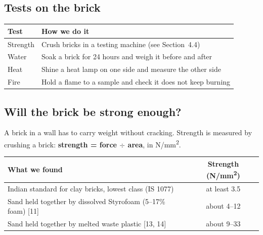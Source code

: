 \documentclass[11pt,a4paper]{article}
\begin{document}
\subsection{Tests on the brick}
\begin{center}
\begin{tabularx}{\textwidth}{@{}l X@{}}
\toprule
Test & How we do it \\
\midrule
Strength & Crush bricks in a testing machine (see Section~4.4) \\
Water & Soak a brick for 24 hours and weigh it before and after \\
Heat & Shine a heat lamp on one side and measure the other side \\
Fire & Hold a flame to a sample and check it does not keep burning \\
\bottomrule
\end{tabularx}
\end{center}

\clearpage
\subsection{Will the brick be strong enough?}
A brick in a wall has to carry weight without cracking. Strength is measured
by crushing a brick: \textbf{strength = force $\div$ area}, in N/mm\textsuperscript{2}.

\begin{center}
\begin{tabularx}{\textwidth}{@{}X c@{}}
\toprule
What we found & Strength (N/mm\textsuperscript{2}) \\
\midrule
Indian standard for clay bricks, lowest class (IS 1077) & at least 3.5 \\
Sand held together by dissolved Styrofoam (5--17\% foam) [11] & about 4--12 \\
Sand held together by melted waste plastic [13, 14] & about 9--33 \\
\bottomrule
\end{tabularx}
\end{center}
\end{document}
